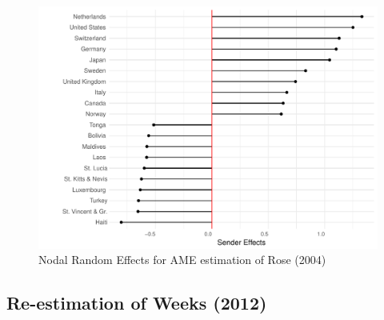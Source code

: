 \begin{figure}
\includegraphics[width=\textwidth]{rose_aeff_top10.pdf}
 \caption{Nodal Random Effects for AME estimation of Rose (2004)}\label{fig:roser}
\end{figure}
\FloatBarrier

\subsection{Re-estimation of Weeks (2012)}


